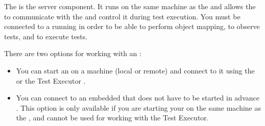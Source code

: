 \label{Agent}

The \gdagent{} is the server component. It runs on the same machine as the \gdaut{} and allows the \ite{} to communicate with the \gdaut{} and control it during test execution. 
You must be connected to a running \gdagent{} in order to be able to perform object mapping, to observe tests, and to execute tests. 

There are two options for working with an \gdagent{}:

\begin{itemize}
\item You can start an \gdagent{} on a machine (local or remote) and connect to it using the \ite{} or the Test Executor .
\item You can connect to an embedded \gdagent{} that does not have to be started in advance . This option is only available if you are starting your \gdaut{} on the same machine as the \ite{}, and cannot be used for working with the Test Executor.
\end{itemize}

